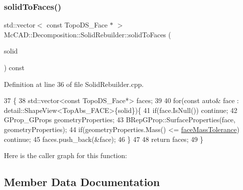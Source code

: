 \mbox{\label{classMcCAD_1_1Decomposition_1_1SolidRebuilder_a865c311ae7c34395b9c7911c88af56cb}} 
\subsubsection{\texorpdfstring{solid\+To\+Faces()}{solidToFaces()}\hspace{0.1cm}{\footnotesize\ttfamily [2/2]}}
{\footnotesize\ttfamily std\+::vector$<$ const Topo\+D\+S\+\_\+\+Face $\ast$ $>$ Mc\+C\+A\+D\+::\+Decomposition\+::\+Solid\+Rebuilder\+::solid\+To\+Faces (\begin{DoxyParamCaption}\item[{const Topo\+D\+S\+\_\+\+Solid \&}]{solid }\end{DoxyParamCaption}) const\hspace{0.3cm}{\ttfamily [private]}}



Definition at line 36 of file Solid\+Rebuilder.\+cpp.


\begin{DoxyCode}
37                                         \{
38     std::vector<const TopoDS\_Face*> faces;
39 
40     \textcolor{keywordflow}{for}(\textcolor{keyword}{const} \textcolor{keyword}{auto}& face : detail::ShapeView<TopAbs\_FACE>\{solid\})\{
41         \textcolor{keywordflow}{if}(face.IsNull()) \textcolor{keywordflow}{continue};
42         GProp\_GProps geometryProperties;
43         BRepGProp::SurfaceProperties(face, geometryProperties);
44         \textcolor{keywordflow}{if}(geometryProperties.Mass() <= \hyperlink{classMcCAD_1_1Decomposition_1_1SolidRebuilder_a7f2b562442c029dfec153a3f16df5b79}{faceMassTolerance}) \textcolor{keywordflow}{continue};
45         faces.push\_back(&face);
46     \}
47 
48     \textcolor{keywordflow}{return} faces;
49 \}
\end{DoxyCode}
Here is the caller graph for this function\+:


\subsection{Member Data Documentation}
\mbox{\label{classMcCAD_1_1Decomposition_1_1SolidRebuilder_a7f2b562442c029dfec153a3f16df5b79}} 
